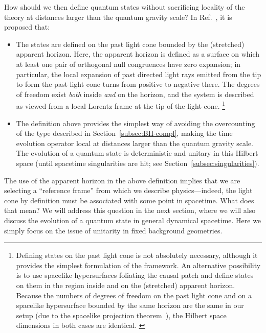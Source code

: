 \documentclass[12pt]{article}
\begin{document}
How should we then define quantum states without sacrificing locality 
of the theory at distances larger than the quantum gravity scale? 
In Ref.~\cite{Nomura:2011dt}, it is proposed that:
%
\begin{itemize}
%
\item
The states are defined on the past light cone bounded by the (stretched) 
apparent horizon.  Here, the apparent horizon is defined as a surface on 
which at least one pair of orthogonal null congruences have zero expansion; 
in particular, the local expansion of past directed light rays emitted 
from the tip to form the past light cone turns from positive to negative 
there.  The degrees of freedom exist {\it both} inside {\it and} on the 
horizon, and the system is described as viewed from a local Lorentz frame 
at the tip of the light cone.%
\footnote{Defining states on the past light cone is not absolutely 
 necessary, although it provides the simplest formulation of the framework. 
 An alternative possibility is to use spacelike hypersurfaces foliating 
 the causal patch and define states on them in the region inside and 
 on the (stretched) apparent horizon.  Because the numbers of degrees of 
 freedom on the past light cone and on a spacelike hypersurface bounded 
 by the same horizon are the same in our setup (due to the spacelike 
 projection theorem~\cite{Bousso:1999xy}), the Hilbert space dimensions 
 in both cases are identical. \label{ft:spacelike}}
%
\item
The definition above provides the simplest way of avoiding the overcounting 
of the type described in Section~\ref{subsec:BH-compl}, making the time 
evolution operator local at distances larger than the quantum gravity 
scale.  The evolution of a quantum state is deterministic and unitary 
in this Hilbert space (until spacetime singularities are hit; see 
Section~\ref{subsec:singularities}).
%
\end{itemize}
%
The use of the apparent horizon in the above definition implies that we 
are selecting a ``reference frame'' from which we describe physics---indeed, 
the light cone by definition must be associated with some point in spacetime. 
What does that mean?  We will address this question in the next section, 
where we will also discuss the evolution of a quantum state in general 
dynamical spacetime.  Here we simply focus on the issue of unitarity 
in fixed background geometries.
\end{document}

